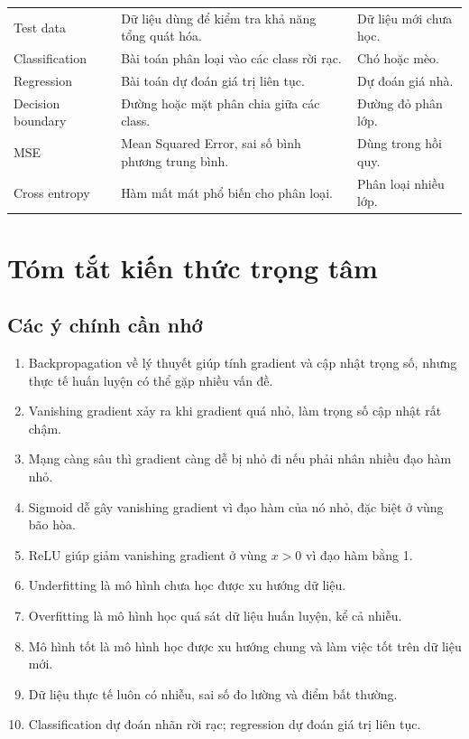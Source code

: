 \documentclass[12pt,a4paper]{report}
\begin{document}
\begin{longtable}{p{}p{}p{}}
Test data & Dữ liệu dùng để kiểm tra khả năng tổng quát hóa. & Dữ liệu mới chưa học. \\

Classification & Bài toán phân loại vào các class rời rạc. & Chó hoặc mèo. \\

Regression & Bài toán dự đoán giá trị liên tục. & Dự đoán giá nhà. \\

Decision boundary & Đường hoặc mặt phân chia giữa các class. & Đường đỏ phân lớp. \\

MSE & Mean Squared Error, sai số bình phương trung bình. & Dùng trong hồi quy. \\

Cross entropy & Hàm mất mát phổ biến cho phân loại. & Phân loại nhiều lớp. \\

\bottomrule
\end{longtable}
\normalsize

\chapter{Tóm tắt kiến thức trọng tâm}

\section{Các ý chính cần nhớ}

\begin{enumerate}
    \item Backpropagation về lý thuyết giúp tính gradient và cập nhật trọng số, nhưng thực tế huấn luyện có thể gặp nhiều vấn đề.
    \item Vanishing gradient xảy ra khi gradient quá nhỏ, làm trọng số cập nhật rất chậm.
    \item Mạng càng sâu thì gradient càng dễ bị nhỏ đi nếu phải nhân nhiều đạo hàm nhỏ.
    \item Sigmoid dễ gây vanishing gradient vì đạo hàm của nó nhỏ, đặc biệt ở vùng bão hòa.
    \item ReLU giúp giảm vanishing gradient ở vùng $x>0$ vì đạo hàm bằng 1.
    \item Underfitting là mô hình chưa học được xu hướng dữ liệu.
    \item Overfitting là mô hình học quá sát dữ liệu huấn luyện, kể cả nhiễu.
    \item Mô hình tốt là mô hình học được xu hướng chung và làm việc tốt trên dữ liệu mới.
    \item Dữ liệu thực tế luôn có nhiễu, sai số đo lường và điểm bất thường.
    \item Classification dự đoán nhãn rời rạc; regression dự đoán giá trị liên tục.
\end{enumerate}
\end{document}
